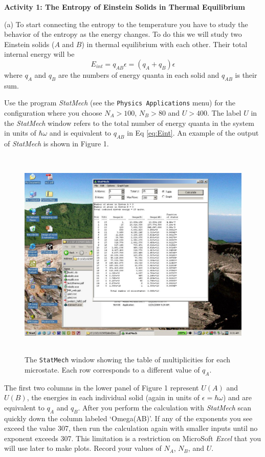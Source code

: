\textbf{Activity 1: The Entropy of Einstein Solids in Thermal Equilibrium}

(a) To start connecting the entropy to the temperature you have to study the 
behavior of the entropy as the energy changes.
To do this we will study two Einstein solids ($A$ and $B$) in thermal equilibrium with 
each other.
Their total internal energy will be
\begin{equation}\label{eq:Eint}
E_{int} = q_{AB}\epsilon = (q_A + q_B) \epsilon
\end{equation}
where $q_A$ and $q_B$ are the numbers of energy quanta in each solid and $q_{AB}$ is 
their sum.

Use the program {\it StatMech} (see the {\tt Physics Applications} menu)
for the configuration where you choose $N_A > 100$, $N_B > 80$ and $U>400$.
The label $U$ in the {\it StatMech} window refers to the total number of energy quanta 
in the system
in units of $\hbar \omega$ and is equivalent to $q_{AB}$  in Eq \ref{eq:Eint}.
An example of the output of {\it StatMech} is shown in Figure 1.
\begin{figure}[ht!]
\begin{center}
\includegraphics[height=4.0in]{entropy_temperature/statmech1.pdf}
\caption{The {\tt StatMech} window showing the table of multiplicities for each microstate.
Each row corresponds to a different value of $q_A$.}
\end{center}
\end{figure}
The first two columns in the lower panel of Figure 1 represent $U(A)$ and $U(B)$, 
the energies in each 
individual solid (again in units of $\epsilon = \hbar \omega$) and are equivalent to $q_A$ and $q_B$.
After you perform the calculation with {\it StatMech} scan quickly down the column
labeled `Omega(AB)'.
If any of the exponents you see exceed the value 307, then run the calculation again with 
smaller inputs until no exponent exceeds 307.
This limitation is a restriction on MicroSoft {\it Excel} that you will use later to make
plots.
Record your values of $N_A$, $N_B$, and $U$.
\answerspace{15mm}

